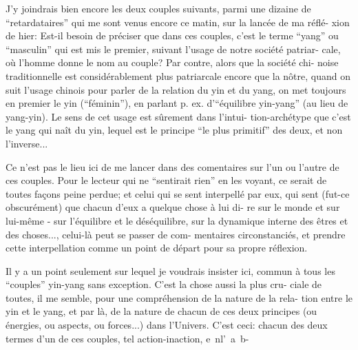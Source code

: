 J'y joindrais bien encore les deux couples suivants, parmi une dizaine de
``retardataires'' qui me sont venus encore ce matin, sur la lancée de ma réflé-
xion de hier:
Est-il besoin de préciser que dans ces couples, c'est le terme ``yang''
ou ``masculin'' qui est mis le premier, suivant l'usage de notre société patriar-
cale, où l'homme donne le nom au couple? Par contre, alors que la société chi-
noise traditionnelle est considérablement plus patriarcale encore que la nôtre,
quand on suit l'usage chinois pour parler de la relation du yin et du yang,
on met toujours en premier le yin (``féminin''), en parlant p. ex. d'``équilibre
yin-yang'' (au lieu de yang-yin). Le sens de cet usage est sûrement dans l'intui-
tion-archétype que c'est le yang qui naît du yin, lequel est le principe ``le
plus primitif'' des deux, et non l'inverse...

Ce n'est pas le lieu ici de me lancer dans des comentaires sur l'un ou
l'autre de ces couples. Pour le lecteur qui ne ``sentirait rien'' en les voyant,
ce serait de toutes façons peine perdue; et celui qui se sent interpellé par
eux, qui sent (fut-ce obscurément) que chacun d'eux a quelque chose à lui di-
re sur le monde et sur lui-même - sur l'équilibre et le déséquilibre, sur la
dynamique interne des êtres et des choses..., celui-là peut se passer de com-
mentaires circonstanciés, et prendre cette interpellation comme un point de
départ pour sa propre réflexion.

Il y a un point seulement sur lequel je voudrais insister ici, commun à
tous les ``couples'' yin-yang sans exception. C'est la chose aussi la plus cru-
ciale de toutes, il me semble, pour une compréhension de la nature de la rela-
tion entre le yin et le yang, et par là, de la nature de chacun de ces deux
principes (ou énergies, ou aspects, ou forces...) dans l'Univers. C'est ceci:
chacun des deux termes d'un de ces couples, tel action-inaction, \mbox{e n\quad l' a b-}
\margin{\unsure{-}}

